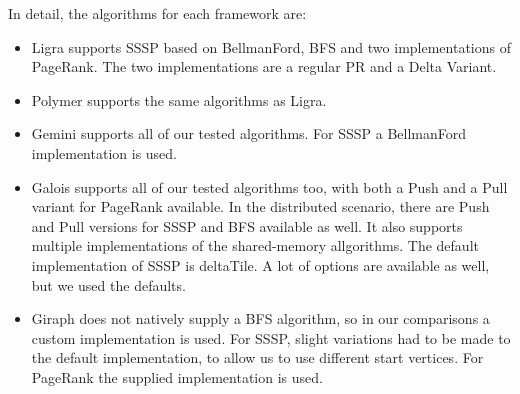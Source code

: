 In detail, the algorithms for each framework are:
\begin{itemize}
	\item Ligra supports SSSP based on BellmanFord, BFS and two implementations of PageRank. The two implementations are a regular PR and a Delta Variant.
	\item Polymer supports the same algorithms as Ligra.
	\item Gemini supports all of our tested algorithms. For SSSP a BellmanFord implementation is used.
	\item Galois supports all of our tested algorithms too, with both a Push and a Pull variant for PageRank available. In the distributed scenario, there are Push and Pull versions for SSSP and BFS available as well. It also supports multiple implementations of the shared-memory allgorithms. The default implementation of SSSP is deltaTile. A lot of options are available as well, but we used the defaults.
	\item Giraph does not natively supply a BFS algorithm, so in our comparisons a custom implementation is used. For SSSP, slight variations had to be made to the default implementation, to allow us to use different start vertices. For PageRank the supplied implementation is used.
\end{itemize}


